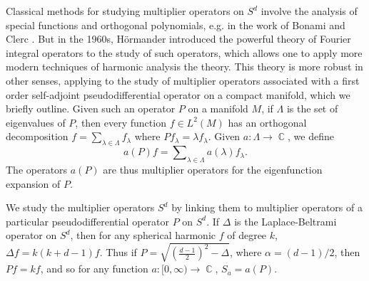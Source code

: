 \documentclass[11pt]{article}
\DeclareMathOperator{\RR}{\mathbb{R}}
\DeclareMathOperator{\CC}{\mathbb{C}}
\begin{document}



Classical methods for studying multiplier operators on $S^d$ involve the analysis of special functions and orthogonal polynomials, e.g. in the work of Bonami and Clerc \cite{BonamiClerc}. But in the 1960s, H\"{o}rmander introduced the powerful theory of Fourier integral operators to the study of such operators, which allows one to apply more modern techniques of harmonic analysis the theory. This theory is more robust in other senses, applying to the study of multiplier operators associated with a first order self-adjoint pseudodifferential operator on a compact manifold, which we briefly outline. Given such an operator $P$ on a manifold $M$, if $\Lambda$ is the set of eigenvalues of $P$, then every function $f \in L^2(M)$ has an orthogonal decomposition $f = \sum_{\lambda \in \Lambda} f_\lambda$ where $Pf_\lambda = \lambda f_\lambda$. Given $a: \Lambda \to \CC$, we define
%
\[ a(P) f = \sum\nolimits_{\lambda \in \Lambda} a(\lambda) f_\lambda. \]
%
The operators $a(P)$ are thus multiplier operators for the eigenfunction expansion of $P$.

We study the multiplier operators $S^d$ by linking them to multiplier operators of a particular pseudodifferential operator $P$ on $S^d$. If $\Delta$ is the Laplace-Beltrami operator on $S^d$, then for any spherical harmonic $f$ of degree $k$, $\Delta f = k(k+d-1) f$. Thus if $P = \sqrt{ ( {\scriptstyle \frac{d-1}{2} } )^2 - \Delta }$, where $\alpha = (d-1)/2$, then $Pf = kf$, and so for any function $a: [0,\infty) \to \CC$, $S_a = a(P)$.
\end{document}
